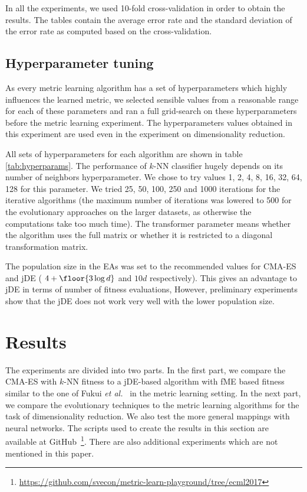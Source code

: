 In all the experiments, we used 10-fold cross-validation in order to obtain the results. The tables contain the average error rate and the standard deviation of the error rate as computed based on the cross-validation.

\subsection{Hyperparameter tuning}

As every metric learning algorithm has a set of hyperparameters which highly influences the learned metric, we selected sensible values from a reasonable range for each of these parameters and ran a full grid-search on these hyperparameters before the metric learning experiment. The hyperparameters values obtained in this experiment are used even in the experiment on dimensionality reduction.

All sets of hyperparameters for each algorithm are shown in table \ref{tab:hyperparams}. The performance of $k$-NN classifier hugely depends on its number of neighbors hyperparameter. We chose to try values 1, 2, 4, 8, 16, 32, 64, 128 for this parameter. We tried 25, 50, 100, 250 and 1000 iterations for the iterative algorithms (the maximum number of iterations was lowered to 500 for the evolutionary approaches on the larger datasets, as otherwise the computations take too much time). The transformer parameter means whether the algorithm uses the full matrix or whether it is restricted to a diagonal transformation matrix.

The population size in the EAs was set to the recommended values for CMA-ES and jDE ( $4+\floor{3\log{d}}$ and $10d$ respectively). This gives an advantage to jDE in terms of number of fitness evaluations, However, preliminary experiments show that the jDE does not work very well with the lower population size.

\section{Results}
The experiments are divided into two parts. In the first part, we compare the CMA-ES with $k$-NN fitness to a jDE-based algorithm with fME based fitness similar to the one of Fukui \emph{et al.}~\cite{fukui2013evolutionary} in the metric learning setting. In the next part, we compare the evolutionary techniques to the metric learning algorithms for the task of dimensionality reduction. We also test the more general mappings with neural networks. The scripts used to create the results in this section are available at GitHub~\footnote{\url{https://github.com/svecon/metric-learn-playground/tree/ecml2017}}. There are also additional experiments which are not mentioned in this paper.

